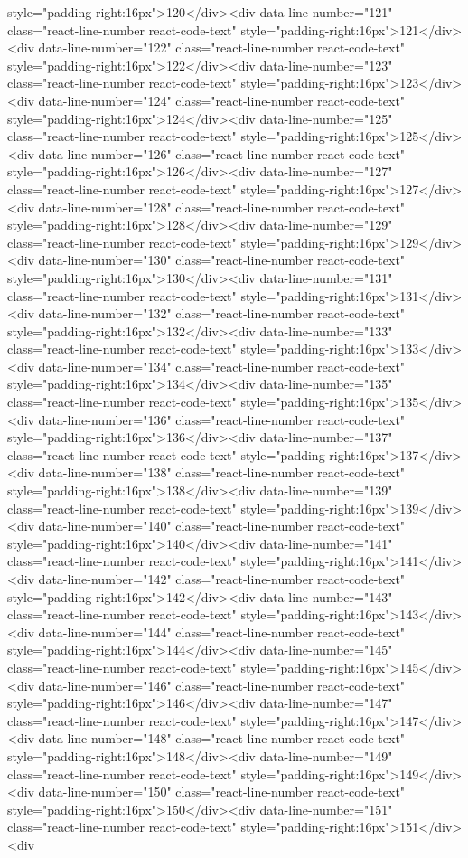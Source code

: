 style="padding-right:16px">120</div><div data-line-number="121" class="react-line-number react-code-text" style="padding-right:16px">121</div><div data-line-number="122" class="react-line-number react-code-text" style="padding-right:16px">122</div><div data-line-number="123" class="react-line-number react-code-text" style="padding-right:16px">123</div><div data-line-number="124" class="react-line-number react-code-text" style="padding-right:16px">124</div><div data-line-number="125" class="react-line-number react-code-text" style="padding-right:16px">125</div><div data-line-number="126" class="react-line-number react-code-text" style="padding-right:16px">126</div><div data-line-number="127" class="react-line-number react-code-text" style="padding-right:16px">127</div><div data-line-number="128" class="react-line-number react-code-text" style="padding-right:16px">128</div><div data-line-number="129" class="react-line-number react-code-text" style="padding-right:16px">129</div><div data-line-number="130" class="react-line-number react-code-text" style="padding-right:16px">130</div><div data-line-number="131" class="react-line-number react-code-text" style="padding-right:16px">131</div><div data-line-number="132" class="react-line-number react-code-text" style="padding-right:16px">132</div><div data-line-number="133" class="react-line-number react-code-text" style="padding-right:16px">133</div><div data-line-number="134" class="react-line-number react-code-text" style="padding-right:16px">134</div><div data-line-number="135" class="react-line-number react-code-text" style="padding-right:16px">135</div><div data-line-number="136" class="react-line-number react-code-text" style="padding-right:16px">136</div><div data-line-number="137" class="react-line-number react-code-text" style="padding-right:16px">137</div><div data-line-number="138" class="react-line-number react-code-text" style="padding-right:16px">138</div><div data-line-number="139" class="react-line-number react-code-text" style="padding-right:16px">139</div><div data-line-number="140" class="react-line-number react-code-text" style="padding-right:16px">140</div><div data-line-number="141" class="react-line-number react-code-text" style="padding-right:16px">141</div><div data-line-number="142" class="react-line-number react-code-text" style="padding-right:16px">142</div><div data-line-number="143" class="react-line-number react-code-text" style="padding-right:16px">143</div><div data-line-number="144" class="react-line-number react-code-text" style="padding-right:16px">144</div><div data-line-number="145" class="react-line-number react-code-text" style="padding-right:16px">145</div><div data-line-number="146" class="react-line-number react-code-text" style="padding-right:16px">146</div><div data-line-number="147" class="react-line-number react-code-text" style="padding-right:16px">147</div><div data-line-number="148" class="react-line-number react-code-text" style="padding-right:16px">148</div><div data-line-number="149" class="react-line-number react-code-text" style="padding-right:16px">149</div><div data-line-number="150" class="react-line-number react-code-text" style="padding-right:16px">150</div><div data-line-number="151" class="react-line-number react-code-text" style="padding-right:16px">151</div><div 